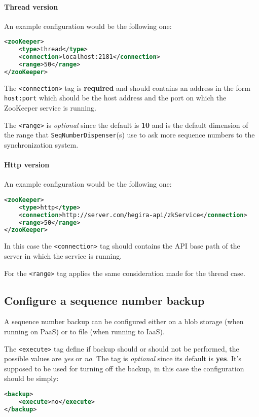 \paragraph{Thread version} An example configuration would be the following one:
\begin{lstlisting}[language=XML, caption=ZooKeeper - thread type configuration]
<zooKeeper>
    <type>thread</type>
    <connection>localhost:2181</connection>
    <range>50</range>
</zooKeeper>
\end{lstlisting}

\noindent The \texttt{<connection>} tag is \textbf{required} and should contains an address in the form \texttt{host:port} which should be the host address and the port on which the ZooKeeper service is running.

\noindent The \texttt{<range>} is \textit{optional} since the default is \textbf{10} and is the default dimension of the range that \texttt{SeqNumberDispenser}(s) use to ask more sequence numbers to the synchronization system.

\paragraph{Http version} An example configuration would be the following one:
\begin{lstlisting}[language=XML, caption=ZooKeeper - http type configuration]
<zooKeeper>
    <type>http</type>
    <connection>http://server.com/hegira-api/zkService</connection>
    <range>50</range>
</zooKeeper>
\end{lstlisting}

\noindent In this case the \texttt{<connection>} tag should contains the API base path of the server in which the service is running.

\noindent For the \texttt{<range>} tag applies the same consideration made for the thread case.
 
\subsection{Configure a sequence number backup}
A sequence number backup can be configured either on a blob storage (when running on PaaS) or to file (when running to IaaS).

\newparagraph  The \texttt{<execute>} tag define if backup should or should not be performed, the possible values are \textit{yes} or \textit{no}. The tag is \textit{optional} since its default is \textbf{yes}.
It's supposed to be used for turning off the backup, in this case the configuration should be simply:
\begin{lstlisting}[language=XML, caption=Turning off sequence numbers backup]
<backup>
    <execute>no</execute>
</backup>
\end{lstlisting}

